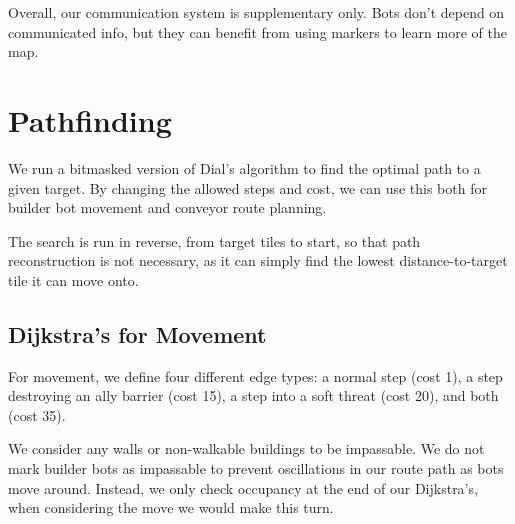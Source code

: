 \documentclass[10pt,sigconf,nonacm]{acmart}
\begin{document}
Overall, our communication system is supplementary only. Bots don't depend on communicated info,
but they can benefit from using markers to learn more of the map.


\section{Pathfinding}

We run a bitmasked version of Dial's algorithm to find the optimal path to a given target. By changing the allowed steps and cost, we can use this both for builder bot movement and conveyor route planning.

The search is run in reverse, from target tiles to start, so that path reconstruction is not necessary, as it can simply find the lowest distance-to-target tile it can move onto.

\subsection{Dijkstra's for Movement}

For movement, we define four different edge types: a normal step (cost 1), a step destroying an ally barrier (cost 15), a step into a soft threat (cost 20), and both (cost 35).

We consider any walls or non-walkable buildings to be impassable. We do not mark builder bots as impassable to prevent oscillations in our route path as bots move around. Instead, we only check occupancy at the end of our Dijkstra's, when considering the move we would make this turn.
\end{document}
